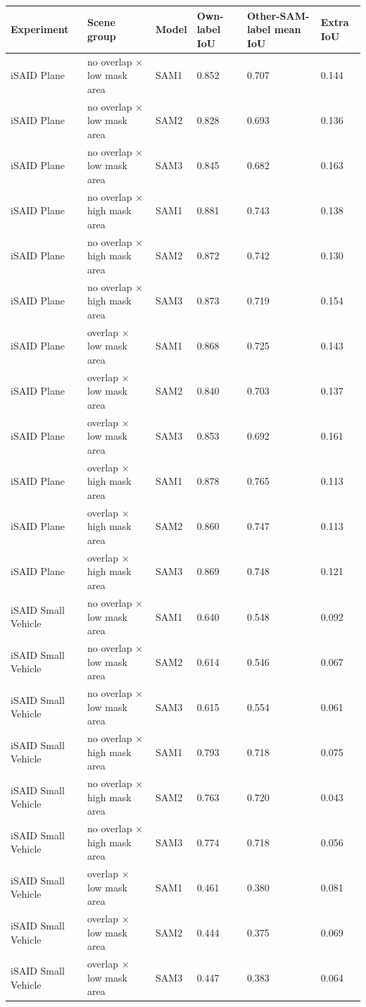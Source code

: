 \begin{tabular}{llllll}
\toprule
Experiment & Scene group & Model & Own-label IoU & Other-SAM-label mean IoU & Extra IoU \\
\midrule
iSAID Plane & no overlap × low mask area & SAM1 & 0.852 & 0.707 & 0.144 \\
iSAID Plane & no overlap × low mask area & SAM2 & 0.828 & 0.693 & 0.136 \\
iSAID Plane & no overlap × low mask area & SAM3 & 0.845 & 0.682 & 0.163 \\
iSAID Plane & no overlap × high mask area & SAM1 & 0.881 & 0.743 & 0.138 \\
iSAID Plane & no overlap × high mask area & SAM2 & 0.872 & 0.742 & 0.130 \\
iSAID Plane & no overlap × high mask area & SAM3 & 0.873 & 0.719 & 0.154 \\
iSAID Plane & overlap × low mask area & SAM1 & 0.868 & 0.725 & 0.143 \\
iSAID Plane & overlap × low mask area & SAM2 & 0.840 & 0.703 & 0.137 \\
iSAID Plane & overlap × low mask area & SAM3 & 0.853 & 0.692 & 0.161 \\
iSAID Plane & overlap × high mask area & SAM1 & 0.878 & 0.765 & 0.113 \\
iSAID Plane & overlap × high mask area & SAM2 & 0.860 & 0.747 & 0.113 \\
iSAID Plane & overlap × high mask area & SAM3 & 0.869 & 0.748 & 0.121 \\
iSAID Small Vehicle & no overlap × low mask area & SAM1 & 0.640 & 0.548 & 0.092 \\
iSAID Small Vehicle & no overlap × low mask area & SAM2 & 0.614 & 0.546 & 0.067 \\
iSAID Small Vehicle & no overlap × low mask area & SAM3 & 0.615 & 0.554 & 0.061 \\
iSAID Small Vehicle & no overlap × high mask area & SAM1 & 0.793 & 0.718 & 0.075 \\
iSAID Small Vehicle & no overlap × high mask area & SAM2 & 0.763 & 0.720 & 0.043 \\
iSAID Small Vehicle & no overlap × high mask area & SAM3 & 0.774 & 0.718 & 0.056 \\
iSAID Small Vehicle & overlap × low mask area & SAM1 & 0.461 & 0.380 & 0.081 \\
iSAID Small Vehicle & overlap × low mask area & SAM2 & 0.444 & 0.375 & 0.069 \\
iSAID Small Vehicle & overlap × low mask area & SAM3 & 0.447 & 0.383 & 0.064 \\

\end{tabular}
